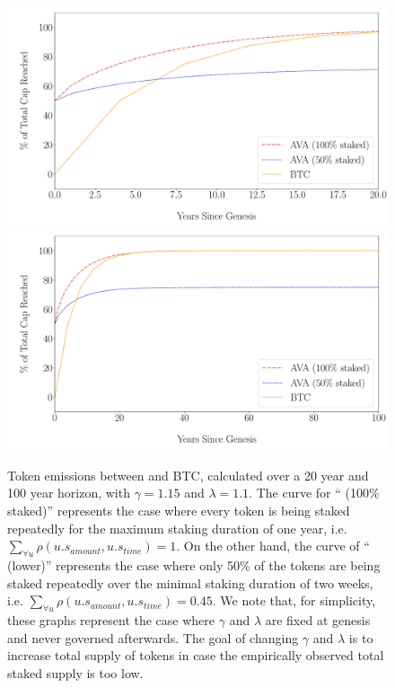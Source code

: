 \documentclass[runningheads]{llncs}
\begin{document}
\begin{figure}[h!]
\centering
\includegraphics[width=\linewidth]{./mintingfunction_20years.pdf}
\includegraphics[width=\linewidth]{./mintingfunction_100years.pdf}
\caption{Token emissions between \AVATokenName{} and BTC, calculated over a 20 year and 100 year horizon, with $\gamma = 1.15$ and $\lambda=1.1$. The curve for ``\AVATokenName{} (100\% staked)'' represents the case where every token is being staked repeatedly for the maximum staking duration of one year, i.e. $\sum_{\forall u} \rho(u.s_{amount}, u.s_{time}) = 1$. On the other hand, the curve of ``\AVATokenName{} (lower)'' represents the case where only 50\% of the tokens are being staked repeatedly over the minimal staking duration of two weeks, i.e. $\sum_{\forall u} \rho(u.s_{amount}, u.s_{time}) = 0.45$. We note that, for simplicity, these graphs represent the case where $\gamma$ and $\lambda$ are fixed at genesis and never governed afterwards. The goal of changing $\gamma$ and $\lambda$ is to increase total supply of tokens in case the empirically observed total staked supply is too low.}
\label{figure:mintingfunction_graph}
\end{figure}
\clearpage
\end{document}
